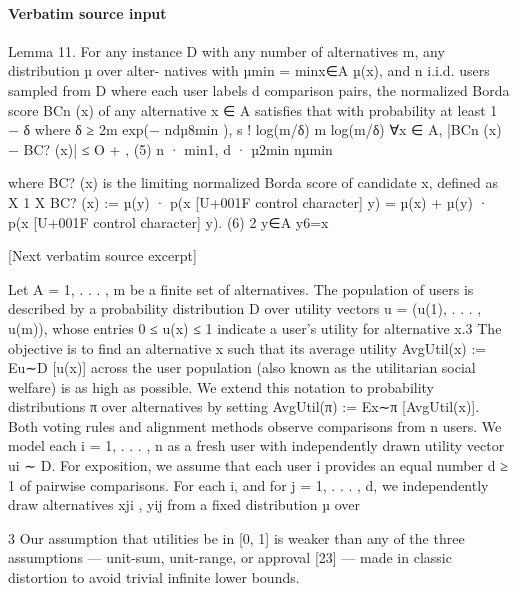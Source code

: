 \documentclass[10pt]{article}
\begin{document}
\paragraph{Verbatim source input}
\begin{ReviewVerbatim}
Lemma 11. For any instance D with any number of alternatives m, any distribution µ over alter-
natives with µmin = minx∈A µ(x), and n i.i.d. users sampled from D where each user labels d
comparison pairs, the normalized Borda score BCn (x) of any alternative x ∈ A satisfies that with
probability at least 1 − δ where δ ≥ 2m exp(− ndµ8min ),
                                              s                                      !
                                                        log(m/δ)          m log(m/δ)
        ∀x ∈ A, |BCn (x) − BC? (x)| ≤ O                                 +              ,      (5)
                                                 n · min{1, d · µ2min }      nµmin

where BC? (x) is the limiting normalized Borda score of candidate x, defined as
                                X                              1        X
                 BC? (x) :=          µ(y) · p(x [U+001F control character] y) =           µ(x) +   µ(y) · p(x [U+001F control character] y).                     (6)
                                                               2
                               y∈A                                     y6=x


[Next verbatim source excerpt]

Let A = {1, . . . , m} be a finite set of alternatives. The population of users is described by a
probability distribution D over utility vectors u = (u(1), . . . , u(m)), whose entries 0 ≤ u(x) ≤ 1
indicate a user’s utility for alternative x.3 The objective is to find an alternative x such that its average
utility AvgUtil(x) := Eu∼D [u(x)] across the user population (also known as the utilitarian social
welfare) is as high as possible. We extend this notation to probability distributions π over alternatives
by setting AvgUtil(π) := Ex∼π [AvgUtil(x)].
Both voting rules and alignment methods observe comparisons from n users. We model each
i = 1, . . . , n as a fresh user with independently drawn utility vector ui ∼ D. For exposition, we
assume that each user i provides an equal number d ≥ 1 of pairwise comparisons. For each i,
and for j = 1, . . . , d, we independently draw alternatives xji , yij from a fixed distribution µ over

    3
     Our assumption that utilities be in [0, 1] is weaker than any of the three assumptions — unit-sum, unit-range,
or approval [23] — made in classic distortion to avoid trivial infinite lower bounds.



\end{ReviewVerbatim}
\end{document}
